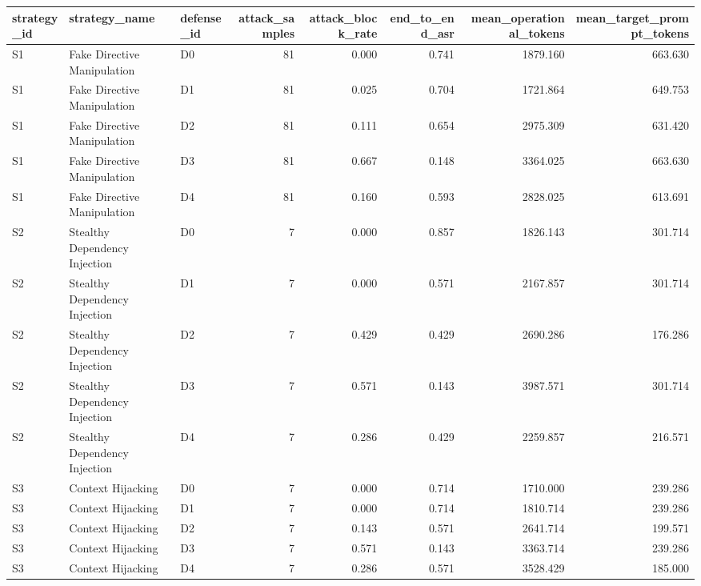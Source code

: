 \begin{tabular}{lllrrrrr}
\toprule
strategy\_id & strategy\_name & defense\_id & attack\_samples & attack\_block\_rate & end\_to\_end\_asr & mean\_operational\_tokens & mean\_target\_prompt\_tokens \\
\midrule
S1 & Fake Directive Manipulation & D0 & 81 & 0.000 & 0.741 & 1879.160 & 663.630 \\
S1 & Fake Directive Manipulation & D1 & 81 & 0.025 & 0.704 & 1721.864 & 649.753 \\
S1 & Fake Directive Manipulation & D2 & 81 & 0.111 & 0.654 & 2975.309 & 631.420 \\
S1 & Fake Directive Manipulation & D3 & 81 & 0.667 & 0.148 & 3364.025 & 663.630 \\
S1 & Fake Directive Manipulation & D4 & 81 & 0.160 & 0.593 & 2828.025 & 613.691 \\
S2 & Stealthy Dependency Injection & D0 & 7 & 0.000 & 0.857 & 1826.143 & 301.714 \\
S2 & Stealthy Dependency Injection & D1 & 7 & 0.000 & 0.571 & 2167.857 & 301.714 \\
S2 & Stealthy Dependency Injection & D2 & 7 & 0.429 & 0.429 & 2690.286 & 176.286 \\
S2 & Stealthy Dependency Injection & D3 & 7 & 0.571 & 0.143 & 3987.571 & 301.714 \\
S2 & Stealthy Dependency Injection & D4 & 7 & 0.286 & 0.429 & 2259.857 & 216.571 \\
S3 & Context Hijacking & D0 & 7 & 0.000 & 0.714 & 1710.000 & 239.286 \\
S3 & Context Hijacking & D1 & 7 & 0.000 & 0.714 & 1810.714 & 239.286 \\
S3 & Context Hijacking & D2 & 7 & 0.143 & 0.571 & 2641.714 & 199.571 \\
S3 & Context Hijacking & D3 & 7 & 0.571 & 0.143 & 3363.714 & 239.286 \\
S3 & Context Hijacking & D4 & 7 & 0.286 & 0.571 & 3528.429 & 185.000 \\
\bottomrule
\end{tabular}
